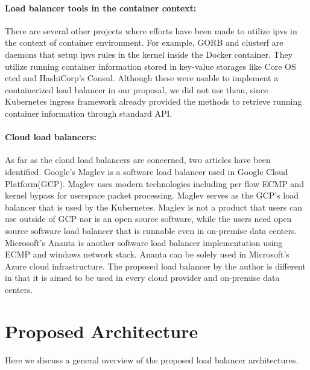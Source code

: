 \paragraph{\bf Load balancer tools in the container context:}
There are several other projects where efforts have been made to utilize ipvs in the context of container environment.
For example, GORB\cite{Sibiryov2015} and clusterf\cite{Aaltodoc:http://urn.fi/URN:NBN:fi:aalto-201611025433} are daemons 
that setup ipvs rules in the kernel inside the Docker container. 
They utilize running container information stored in key-value storages
like Core OS etcd\cite{CoreOSEtcd} and HashiCorp's Consul\cite{HashiCorpConsul}. 
Although these were usable to implement a containerized load balancer in our proposal, we did not use them, 
since Kubernetes ingress framework already provided the methods to retrieve running container information through standard API.

\paragraph{\bf Cloud load balancers:}

As far as the cloud load balancers are concerned, two articles have been identified.
Google's Maglev\cite{eisenbud2016maglev} is a software load balancer used in Google Cloud Platform(GCP).
Maglev uses modern technologies including per flow ECMP and kernel bypass for userspace packet processing.
Maglev serves as the GCP's load balancer that is used by the Kubernetes.
Maglev is not a product that users can use outside of GCP nor is an open source software, while the users need open source software load balancer that is runnable even in on-premise data centers.
Microsoft's Ananta\cite{patel2013ananta} is another software load balancer implementation using ECMP and windows network stack.
Ananta can be solely used in Microsoft's Azure cloud infrastructure\cite{patel2013ananta}.
The proposed load balancer by the author is different in that it is aimed to be used in every cloud provider and on-premise data centers.

\section{Proposed Architecture}\label{Proposed Architecture}

Here we discuss a general overview of the proposed load balancer architectures.


